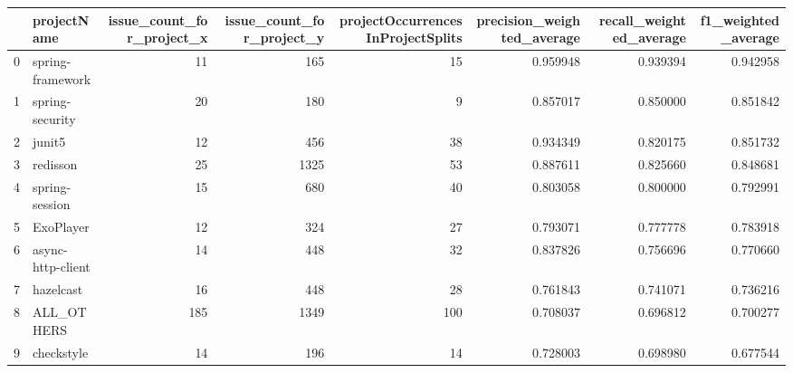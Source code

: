 \begin{tabular}{llrrrrrr}
\toprule
{} &        projectName &  issue\_count\_for\_project\_x &  issue\_count\_for\_project\_y &  projectOccurrencesInProjectSplits &  precision\_weighted\_average &  recall\_weighted\_average &  f1\_weighted\_average \\
\midrule
0  &   spring-framework &                         11 &                        165 &                                 15 &                    0.959948 &                 0.939394 &             0.942958 \\
1  &    spring-security &                         20 &                        180 &                                  9 &                    0.857017 &                 0.850000 &             0.851842 \\
2  &             junit5 &                         12 &                        456 &                                 38 &                    0.934349 &                 0.820175 &             0.851732 \\
3  &           redisson &                         25 &                       1325 &                                 53 &                    0.887611 &                 0.825660 &             0.848681 \\
4  &     spring-session &                         15 &                        680 &                                 40 &                    0.803058 &                 0.800000 &             0.792991 \\
5  &          ExoPlayer &                         12 &                        324 &                                 27 &                    0.793071 &                 0.777778 &             0.783918 \\
6  &  async-http-client &                         14 &                        448 &                                 32 &                    0.837826 &                 0.756696 &             0.770660 \\
7  &          hazelcast &                         16 &                        448 &                                 28 &                    0.761843 &                 0.741071 &             0.736216 \\
8  &         ALL\_OTHERS &                        185 &                       1349 &                                100 &                    0.708037 &                 0.696812 &             0.700277 \\
9  &         checkstyle &                         14 &                        196 &                                 14 &                    0.728003 &                 0.698980 &             0.677544 \\

\end{tabular}
